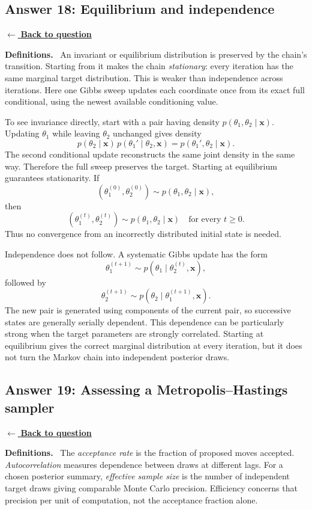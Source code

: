\documentclass[11pt,a4paper]{article}
\newcommand{\given}{\mathrel{|}}
\newcommand{\xvec}{\boldsymbol{x}}
\newcommand{\answernav}[1]{%
  \label{answer:#1}%
  \noindent\hyperref[question:#1]{$\leftarrow$ \textbf{Back to question}}%
  \par\smallskip}
\newcommand{\studyheading}[1]{%
  \par\medskip\noindent\textcolor{statblue}{\textbf{#1.}}\ }
\begin{document}
\subsection{Answer 18: Equilibrium and independence}
\answernav{18}

\studyheading{Definitions}
An invariant or equilibrium distribution is preserved by the chain's transition.
Starting from it makes the chain \emph{stationary}: every iteration has the same marginal target distribution.
This is weaker than independence across iterations.
Here one Gibbs sweep updates each coordinate once from its exact full conditional, using the newest available conditioning value.

To see invariance directly, start with a pair having density
$p(\theta_1,\theta_2\given\xvec)$. Updating $\theta_1$ while leaving
$\theta_2$ unchanged gives density
\[
p(\theta_2\given\xvec)\,
p(\theta_1'\given\theta_2,\xvec)
=p(\theta_1',\theta_2\given\xvec).
\]
The second conditional update reconstructs the same joint density in
the same way. Therefore the full sweep preserves the target.
Starting at equilibrium guarantees stationarity. If
\[
(\theta_1^{(0)},\theta_2^{(0)})
\sim p(\theta_1,\theta_2\mid\xvec),
\]
then
\[
\boxed{
(\theta_1^{(t)},\theta_2^{(t)})
\sim p(\theta_1,\theta_2\mid\xvec)
\quad\text{for every }t\geq0.
}
\]
Thus no convergence from an incorrectly distributed initial state is needed.

Independence does not follow. A systematic Gibbs update has the form
\[
\theta_1^{(t+1)}
\sim p(\theta_1\mid\theta_2^{(t)},\xvec),
\]
followed by
\[
\theta_2^{(t+1)}
\sim p(\theta_2\mid\theta_1^{(t+1)},\xvec).
\]
The new pair is generated using components of the current pair, so successive
states are generally serially dependent. This dependence can be particularly
strong when the target parameters are strongly correlated. Starting at
equilibrium gives the correct marginal distribution at every iteration, but
it does not turn the Markov chain into independent posterior draws.

\clearpage

\subsection{Answer 19: Assessing a Metropolis--Hastings sampler}
\answernav{19}

\studyheading{Definitions}
The \emph{acceptance rate} is the fraction of proposed moves accepted.
\emph{Autocorrelation} measures dependence between draws at different lags.
For a chosen posterior summary, \emph{effective sample size} is the number of independent target draws giving comparable Monte Carlo precision.
Efficiency concerns that precision per unit of computation, not the acceptance fraction alone.
\end{document}
